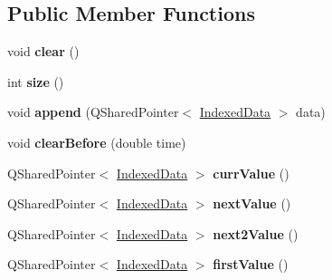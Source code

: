 \subsection*{Public Member Functions}
\begin{DoxyCompactItemize}
\item 
\hypertarget{class_picto_1_1_data_state_list_a73165bfb14ec65f38a11d9881fc57908}{void {\bfseries clear} ()}\label{class_picto_1_1_data_state_list_a73165bfb14ec65f38a11d9881fc57908}

\item 
\hypertarget{class_picto_1_1_data_state_list_a1ce0223ed543778e6b0f796c15949d88}{int {\bfseries size} ()}\label{class_picto_1_1_data_state_list_a1ce0223ed543778e6b0f796c15949d88}

\item 
\hypertarget{class_picto_1_1_data_state_list_aa80fdabfd3ef4813f1b286ad591404b9}{void {\bfseries append} (Q\-Shared\-Pointer$<$ \hyperlink{struct_picto_1_1_indexed_data}{Indexed\-Data} $>$ data)}\label{class_picto_1_1_data_state_list_aa80fdabfd3ef4813f1b286ad591404b9}

\item 
\hypertarget{class_picto_1_1_data_state_list_ab1468b6e770a7d5ac63489185e5dd302}{void {\bfseries clear\-Before} (double time)}\label{class_picto_1_1_data_state_list_ab1468b6e770a7d5ac63489185e5dd302}

\item 
\hypertarget{class_picto_1_1_data_state_list_a44eecb3da8e1260fb6e183cfe779a654}{Q\-Shared\-Pointer$<$ \hyperlink{struct_picto_1_1_indexed_data}{Indexed\-Data} $>$ {\bfseries curr\-Value} ()}\label{class_picto_1_1_data_state_list_a44eecb3da8e1260fb6e183cfe779a654}

\item 
\hypertarget{class_picto_1_1_data_state_list_a537505e2507b482dfe16c4f02b685e59}{Q\-Shared\-Pointer$<$ \hyperlink{struct_picto_1_1_indexed_data}{Indexed\-Data} $>$ {\bfseries next\-Value} ()}\label{class_picto_1_1_data_state_list_a537505e2507b482dfe16c4f02b685e59}

\item 
\hypertarget{class_picto_1_1_data_state_list_acbf4a057f3c5aac414df78e7b2403494}{Q\-Shared\-Pointer$<$ \hyperlink{struct_picto_1_1_indexed_data}{Indexed\-Data} $>$ {\bfseries next2\-Value} ()}\label{class_picto_1_1_data_state_list_acbf4a057f3c5aac414df78e7b2403494}

\item 
\hypertarget{class_picto_1_1_data_state_list_aa55b0e4ebc4a14ae7390a4395c4a5947}{Q\-Shared\-Pointer$<$ \hyperlink{struct_picto_1_1_indexed_data}{Indexed\-Data} $>$ {\bfseries first\-Value} ()}\label{class_picto_1_1_data_state_list_aa55b0e4ebc4a14ae7390a4395c4a5947}


\end{DoxyCompactItemize}
